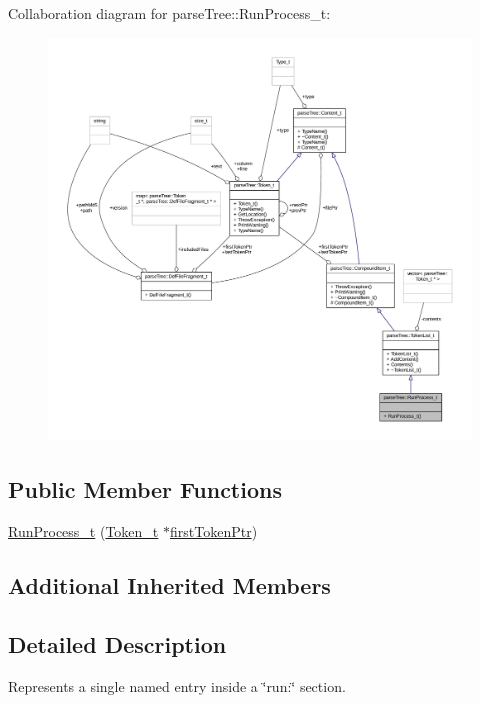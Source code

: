 Collaboration diagram for parse\+Tree\+:\+:Run\+Process\+\_\+t\+:
\nopagebreak
\begin{figure}[H]
\begin{center}
\leavevmode
\includegraphics[width=350pt]{structparse_tree_1_1_run_process__t__coll__graph}
\end{center}
\end{figure}
\subsection*{Public Member Functions}
\begin{DoxyCompactItemize}
\item 
\hyperlink{structparse_tree_1_1_run_process__t_af327d8fd0cc5ed926f04b36978fc4964}{Run\+Process\+\_\+t} (\hyperlink{structparse_tree_1_1_token__t}{Token\+\_\+t} $\ast$\hyperlink{structparse_tree_1_1_compound_item__t_a587020c943e760cb0152dd8cd31e21ef}{first\+Token\+Ptr})
\end{DoxyCompactItemize}
\subsection*{Additional Inherited Members}


\subsection{Detailed Description}
Represents a single named entry inside a \char`\"{}run\+:\char`\"{} section. 

